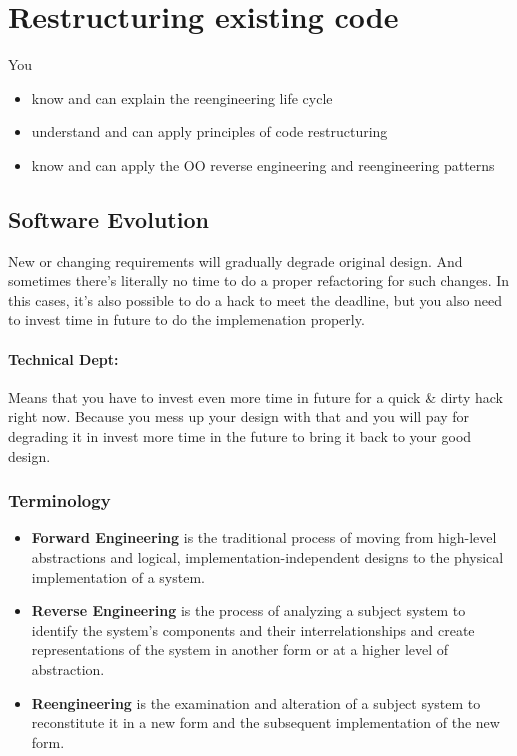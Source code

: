\hypertarget{restructuring-existing-code}{%
\section{Restructuring existing
code}\label{restructuring-existing-code}}

\begin{tcolorbox}[colback=blue!5!white,colframe=blue!75!black]
You

\begin{itemize}
\tightlist
\item
  know and can explain the reengineering life cycle
\item
  understand and can apply principles of code restructuring
\item
  know and can apply the OO reverse engineering and reengineering
  patterns
\end{itemize}
\end{tcolorbox}

\hypertarget{software-evolution}{%
\subsection{Software Evolution}\label{software-evolution}}

New or changing requirements will gradually degrade original design. And
sometimes there's literally no time to do a proper refactoring for such
changes. In this cases, it's also possible to do a hack to meet the
deadline, but you also need to invest time in future to do the
implemenation properly.


\paragraph{Technical Dept:} Means that you have to invest even more time in future for a quick \& dirty hack right now. Because you mess up your design with that and you will pay for degrading it in invest more time in the future to bring it back to your good design.


\hypertarget{terminology}{%
\subsubsection{Terminology}\label{terminology}}

\begin{itemize}
\tightlist
\item
  \textbf{Forward Engineering} is the traditional process of moving from
  high-level abstractions and logical, implementation-independent
  designs to the physical implementation of a system.
\item
  \textbf{Reverse Engineering} is the process of analyzing a subject
  system to identify the system's components and their
  interrelationships and create representations of the system in another
  form or at a higher level of abstraction.
\item
  \textbf{Reengineering} is the examination and alteration of a subject
  system to reconstitute it in a new form and the subsequent
  implementation of the new form.
\end{itemize}

